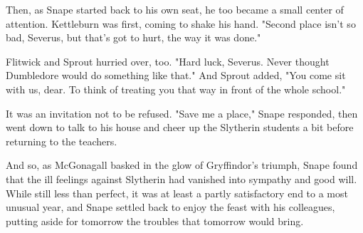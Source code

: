 Then, as Snape started back to his own seat, he too became a small center of attention. Kettleburn was first, coming to shake his hand. "Second place isn't so bad, Severus, but that's got to hurt, the way it was done."

Flitwick and Sprout hurried over, too. "Hard luck, Severus. Never thought Dumbledore would do something like that." And Sprout added, "You come sit with us, dear. To think of treating you that way in front of the whole school."

It was an invitation not to be refused. "Save me a place," Snape responded, then went down to talk to his house and cheer up the Slytherin students a bit before returning to the teachers.

And so, as McGonagall basked in the glow of Gryffindor's triumph, Snape found that the ill feelings against Slytherin had vanished into sympathy and good will. While still less than perfect, it was at least a partly satisfactory end to a most unusual year, and Snape settled back to enjoy the feast with his colleagues, putting aside for tomorrow the troubles that tomorrow would bring.

